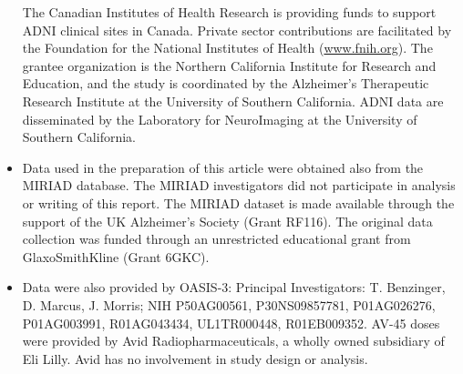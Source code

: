 \begin{itemize}
The Canadian Institutes of Health Research is providing funds to support ADNI clinical sites in Canada.
Private sector contributions are facilitated by the Foundation for the National Institutes of Health (\url{www.fnih.org}).
The grantee organization is the Northern California Institute for Research and Education, and the study is coordinated by the Alzheimer's Therapeutic Research Institute at the University of Southern California.
ADNI data are disseminated by the Laboratory for NeuroImaging at the University of Southern California.
%
\item Data used in the preparation of this article were obtained also from the MIRIAD database.
The MIRIAD investigators did not participate in analysis or writing of this report.
The MIRIAD dataset is made available through the support of the UK Alzheimer's Society (Grant RF116).
The original data collection was funded through an unrestricted educational grant from GlaxoSmithKline (Grant 6GKC).
%
\item Data were also provided by OASIS-3:
Principal Investigators: T. Benzinger, D. Marcus, J. Morris; NIH P50AG00561, P30NS09857781, P01AG026276, P01AG003991, R01AG043434, UL1TR000448, R01EB009352.
AV-45 doses were provided by Avid Radiopharmaceuticals, a wholly owned subsidiary of Eli Lilly.
Avid has no involvement in study design or analysis.
%
\end{itemize}


